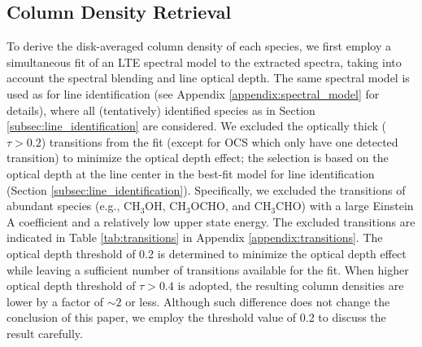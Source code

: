 \documentclass[linenumbers, twocolumn, twocolappendix, astrosymb, times]{aastex631}
\newcommand{\methanol}{CH$_3$OH\xspace}
\newcommand{\acetaldehyde}{CH$_3$CHO\xspace}
\newcommand{\methylformate}{CH$_3$OCHO\xspace}
\begin{document}
\subsection{Column Density Retrieval}\label{subsec:spectral_fit}
To derive the disk-averaged column density of each species, we first employ a simultaneous fit of an LTE spectral model to the extracted spectra, taking into account the spectral blending and line optical depth. The same spectral model is used as for line identification (see Appendix \ref{appendix:spectral_model} for details), where all (tentatively) identified species as in Section \ref{subsec:line_identification} are considered. We excluded the optically thick ($\tau > 0.2$) transitions from the fit (except for OCS which only have one detected transition) to minimize the optical depth effect; the selection is based on the optical depth at the line center in the best-fit model for line identification (Section \ref{subsec:line_identification}). Specifically, we excluded the transitions of abundant species (e.g., \methanol, \methylformate, and \acetaldehyde) with a large Einstein A coefficient and a relatively low upper state energy. The excluded transitions are indicated in Table \ref{tab:transitions} in Appendix \ref{appendix:transitions}. The optical depth threshold of 0.2 is determined to minimize the optical depth effect while leaving a sufficient number of transitions available for the fit. When higher optical depth threshold of $\tau > 0.4$ is adopted, the resulting column densities are lower by a factor of $\sim2$ or less. Although such difference does not change the conclusion of this paper, we employ the threshold value of 0.2 to discuss the result carefully.
\end{document}

